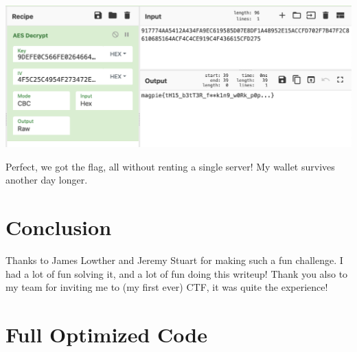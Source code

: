 \documentclass[11pt]{article}
\begin{document}
    \medskip

    \noindent\includegraphics[width=\textwidth]{images/cyberchef}

    \medskip

    Perfect, we got the flag, all without renting a single server! My wallet survives another day longer.


    \section{Conclusion}\label{sec:conclusion}

    Thanks to James Lowther and Jeremy Stuart for making such a fun challenge. I had a lot of fun solving it, and a lot of fun doing this writeup! Thank you also to my team for inviting me to (my first ever) CTF, it was quite the experience!

    \pagebreak

    \appendix


    \section{Full Optimized Code}\label{sec:full-optimized-code}
\end{document}
